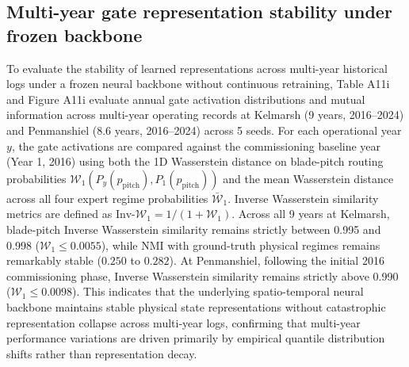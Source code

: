\documentclass[
  journal]{IEEEtran}
\begin{document}
\begin{table}[!t]
\end{table}

\FloatBarrier

\subsection*{Multi-year gate representation stability under frozen
backbone}\label{multi-year-gate-representation-stability-under-frozen-backbone}

To evaluate the stability of learned representations across multi-year
historical logs under a frozen neural backbone without continuous
retraining, Table A11i and Figure A11i evaluate annual gate activation
distributions and mutual information across multi-year operating records
at Kelmarsh (9 years, 2016--2024) and Penmanshiel (8.6 years,
2016--2024) across 5 seeds. For each operational year \(y\), the gate
activations are compared against the commissioning baseline year (Year
1, 2016) using both the 1D Wasserstein distance on blade-pitch routing
probabilities
\(\mathcal{W}_1(P_y(p_{\mathrm{pitch}}), P_1(p_{\mathrm{pitch}}))\) and
the mean Wasserstein distance across all four expert regime
probabilities \(\bar{\mathcal{W}}_1\). Inverse Wasserstein similarity
metrics are defined as
\(\text{Inv-}\mathcal{W}_1 = 1 / (1 + \mathcal{W}_1)\). Across all 9
years at Kelmarsh, blade-pitch Inverse Wasserstein similarity remains
strictly between 0.995 and 0.998 (\(\mathcal{W}_1 \le 0.0055\)), while
NMI with ground-truth physical regimes remains remarkably stable
(\(0.250\) to \(0.282\)). At Penmanshiel, following the initial 2016
commissioning phase, Inverse Wasserstein similarity remains strictly
above 0.990 (\(\mathcal{W}_1 \le 0.0098\)). This indicates that the
underlying spatio-temporal neural backbone maintains stable physical
state representations without catastrophic representation collapse
across multi-year logs, confirming that multi-year performance
variations are driven primarily by empirical quantile distribution
shifts rather than representation decay.
\end{document}
